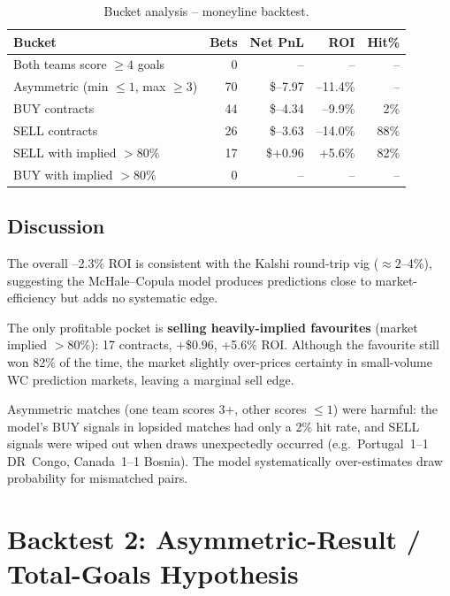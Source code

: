 \documentclass[11pt, a4paper]{article}
\begin{document}
\begin{table}[h!]
\centering
\caption{Bucket analysis -- moneyline backtest.}
\begin{tabular}{lrrrr}
\toprule
Bucket & Bets & Net PnL & ROI & Hit\% \\
\midrule
Both teams score $\geq 4$ goals     &  0 &    --   &    --   & -- \\
Asymmetric (min $\leq 1$, max $\geq 3$) & 70 & \$--7.97 & --11.4\% & -- \\
\quad BUY contracts                 & 44 & \$--4.34 &  --9.9\% &  2\% \\
\quad SELL contracts                & 26 & \$--3.63 & --14.0\% & 88\% \\
SELL with implied $> 80\%$          & 17 & \$+0.96  &  +5.6\%  & 82\% \\
BUY  with implied $> 80\%$          &  0 &    --    &    --    &  -- \\
\bottomrule
\end{tabular}
\end{table}

\subsection{Discussion}

The overall --2.3\% ROI is consistent with the Kalshi round-trip vig
(\(\approx 2\)--4\%), suggesting the McHale--Copula model produces
predictions close to market-efficiency but adds no systematic edge.

The only profitable pocket is \textbf{selling heavily-implied favourites}
(market implied $> 80\%$): 17 contracts, +\$0.96, +5.6\% ROI.
Although the favourite still won 82\% of the time, the market slightly
over-prices certainty in small-volume WC prediction markets, leaving a
marginal sell edge.

Asymmetric matches (one team scores 3+, other scores $\leq 1$) were
harmful: the model's BUY signals in lopsided matches had only a 2\% hit
rate, and SELL signals were wiped out when draws unexpectedly occurred (e.g.\
Portugal~1--1 DR~Congo, Canada~1--1 Bosnia). The model systematically
over-estimates draw probability for mismatched pairs.

\bigskip

\section{Backtest 2: Asymmetric-Result / Total-Goals Hypothesis}
\end{document}
